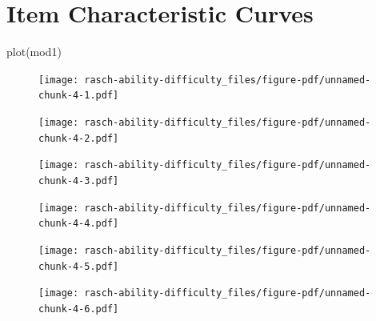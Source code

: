 \documentclass[
  letterpaper,
  DIV=11,
  numbers=noendperiod]{scrreprt}
\newenvironment{Shaded}{\begin{snugshade}}{\end{snugshade}}
\newcommand{\FunctionTok}[1]{\textcolor[rgb]{0.28,0.35,0.67}{#1}}
\newcommand{\NormalTok}[1]{\textcolor[rgb]{0.00,0.23,0.31}{#1}}
\begin{document}
\hypertarget{item-characteristic-curves}{%
\section{Item Characteristic Curves}\label{item-characteristic-curves}}

\begin{Shaded}
\begin{Highlighting}[]
\FunctionTok{plot}\NormalTok{(mod1)}
\end{Highlighting}
\end{Shaded}

\begin{figure}[H]

{\centering \texttt{[image: rasch-ability-difficulty\_files/figure-pdf/unnamed-chunk-4-1.pdf]}

}

\end{figure}

\begin{figure}[H]

{\centering \texttt{[image: rasch-ability-difficulty\_files/figure-pdf/unnamed-chunk-4-2.pdf]}

}

\end{figure}

\begin{figure}[H]

{\centering \texttt{[image: rasch-ability-difficulty\_files/figure-pdf/unnamed-chunk-4-3.pdf]}

}

\end{figure}

\begin{figure}[H]

{\centering \texttt{[image: rasch-ability-difficulty\_files/figure-pdf/unnamed-chunk-4-4.pdf]}

}

\end{figure}

\begin{figure}[H]

{\centering \texttt{[image: rasch-ability-difficulty\_files/figure-pdf/unnamed-chunk-4-5.pdf]}

}

\end{figure}

\begin{figure}[H]

{\centering \texttt{[image: rasch-ability-difficulty\_files/figure-pdf/unnamed-chunk-4-6.pdf]}

}

\end{figure}
\end{document}
